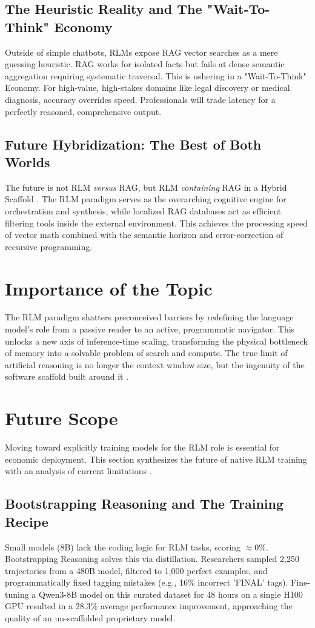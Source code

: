 \subsection{The Heuristic Reality and The "Wait-To-Think" Economy}
Outside of simple chatbots, RLMs expose RAG vector searches as a mere guessing heuristic. RAG works for isolated facts but fails at dense semantic aggregation requiring systematic traversal. This is ushering in a "Wait-To-Think" Economy. For high-value, high-stakes domains like legal discovery or medical diagnosis, accuracy overrides speed. Professionals will trade latency for a perfectly reasoned, comprehensive output.

\subsection{Future Hybridization: The Best of Both Worlds}
The future is not RLM \textit{versus} RAG, but RLM \textit{containing} RAG in a Hybrid Scaffold \cite{khattab2021}. The RLM paradigm serves as the overarching cognitive engine for orchestration and synthesis, while localized RAG databases act as efficient filtering tools inside the external environment. This achieves the processing speed of vector math combined with the semantic horizon and error-correction of recursive programming.


\section{Importance of the Topic}
The RLM paradigm shatters preconceived barriers by redefining the language model's role from a passive reader to an active, programmatic navigator. This unlocks a new axis of inference-time scaling, transforming the physical bottleneck of memory into a solvable problem of search and compute. The true limit of artificial reasoning is no longer the context window size, but the ingenuity of the software scaffold built around it \cite{zhang2025}.

\section{Future Scope}
Moving toward explicitly training models for the RLM role is essential for economic deployment. This section synthesizes the future of native RLM training with an analysis of current limitations \cite{zhang2025, deepseek2025}.

\subsection{Bootstrapping Reasoning and The Training Recipe}
Small models (8B) lack the coding logic for RLM tasks, scoring $\approx$0\%. Bootstrapping Reasoning solves this via distillation. Researchers sampled 2,250 trajectories from a 480B model, filtered to 1,000 perfect examples, and programmatically fixed tagging mistakes (e.g., 16\% incorrect 'FINAL' tags). Fine-tuning a Qwen3-8B model on this curated dataset for 48 hours on a single H100 GPU resulted in a 28.3\% average performance improvement, approaching the quality of an un-scaffolded proprietary model.

